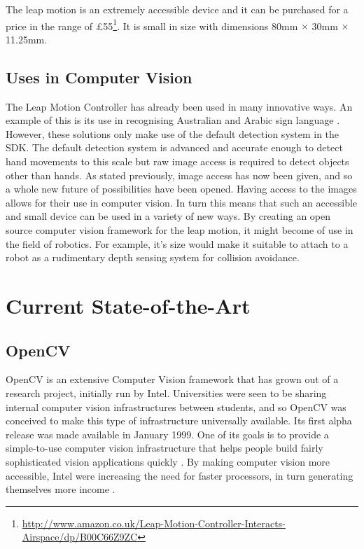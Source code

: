 \documentclass[11pt,oneside]{report}
\begin{document}
				The leap motion is an extremely accessible device and it can be purchased for a price in the range of \pounds55\footnote{\url{http://www.amazon.co.uk/Leap-Motion-Controller-Interacts-Airspace/dp/B00C66Z9ZC}}.
				It is small in size with dimensions 80mm $\times$ 30mm $\times$ 11.25mm.
				
				
				

			\subsection{Uses in Computer Vision}
				The Leap Motion Controller has already been used in many innovative ways.
				An example of this is its use in recognising Australian and Arabic sign language \cite{journal:leapSignLanguage,journal:leapSignLanguage2}.
				However, these solutions only make use of the default detection system in the SDK.
				The default detection system is advanced and accurate enough to detect hand movements to this scale but raw image access is required to detect objects other than hands.
				As stated previously, image access has now been given, and so a whole new future of possibilities have been opened.
				Having access to the images allows for their use in computer vision.
				In turn this means that such an accessible and small device can be used in a variety of new ways.
				By creating an open source computer vision framework for the leap motion, it might become of use in the field of robotics.
				For example, it's size would make it suitable to attach to a robot as a rudimentary depth sensing system for collision avoidance.
				
			
		\section{Current State-of-the-Art}
		
			\subsection{OpenCV}
				OpenCV is an extensive Computer Vision framework that has grown out of a research project, initially run by Intel.
				Universities were seen to be sharing internal computer vision infrastructures between students, and so OpenCV was conceived to make this type of infrastructure universally available.
				Its first alpha release was made available in January 1999.
				One of its goals is to provide a simple-to-use computer vision infrastructure that helps people build fairly sophisticated vision applications quickly \cite[p. 1]{definition:cv}.	
				By making computer vision more accessible, Intel were increasing the need for faster processors, in turn generating themselves more income \cite{definition:cv}.
				
\end{document}
